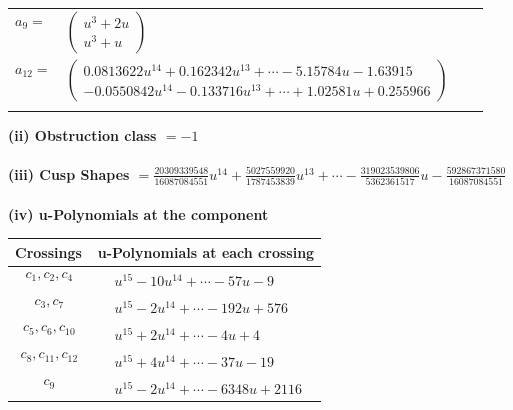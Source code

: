 \documentclass[1p]{elsarticle_modified}
\theoremstyle{definition}
\begin{document}
\begin{tabular}{m{7pt} m{180pt} m{7pt} m{180pt} }
\flushright $a_{9}=$&$\begin{pmatrix}u^3+2 u\\u^3+u\end{pmatrix}$ \\
\flushright $a_{12}=$&$\begin{pmatrix}0.0813622 u^{14}+0.162342 u^{13}+\cdots-5.15784 u-1.63915\\-0.0550842 u^{14}-0.133716 u^{13}+\cdots+1.02581 u+0.255966\end{pmatrix}$\\&\end{tabular}
\flushleft \textbf{(ii) Obstruction class $= -1$}\\~\\
\flushleft \textbf{(iii) Cusp Shapes $= \frac{20309339548}{16087084551} u^{14}+\frac{5027559920}{1787453839} u^{13}+\cdots-\frac{319023539806}{5362361517} u-\frac{592867371580}{16087084551}$}\\~\\
\newpage\renewcommand{\arraystretch}{1}
\flushleft \textbf{(iv) u-Polynomials at the component}\newline \\
\begin{tabular}{m{50pt}|m{274pt}}
Crossings & \hspace{64pt}u-Polynomials at each crossing \\
\hline $$\begin{aligned}c_{1},c_{2},c_{4}\end{aligned}$$&$\begin{aligned}
&u^{15}-10 u^{14}+\cdots-57 u-9
\end{aligned}$\\
\hline $$\begin{aligned}c_{3},c_{7}\end{aligned}$$&$\begin{aligned}
&u^{15}-2 u^{14}+\cdots-192 u+576
\end{aligned}$\\
\hline $$\begin{aligned}c_{5},c_{6},c_{10}\end{aligned}$$&$\begin{aligned}
&u^{15}+2 u^{14}+\cdots-4 u+4
\end{aligned}$\\
\hline $$\begin{aligned}c_{8},c_{11},c_{12}\end{aligned}$$&$\begin{aligned}
&u^{15}+4 u^{14}+\cdots-37 u-19
\end{aligned}$\\
\hline $$\begin{aligned}c_{9}\end{aligned}$$&$\begin{aligned}
&u^{15}-2 u^{14}+\cdots-6348 u+2116
\end{aligned}$\\
\hline
\end{tabular}\\~\\
\end{document}
